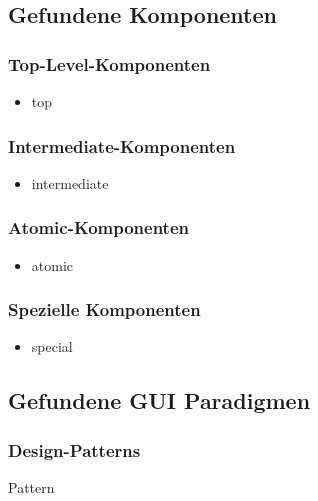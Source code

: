   \subsection{Gefundene Komponenten}
  
  \subsubsection{Top-Level-Komponenten}
  
  \begin{itemize}
    \item top
  \end{itemize}
  
  \subsubsection{Intermediate-Komponenten}
  
  \begin{itemize}
    \item intermediate
  \end{itemize}
  
  \subsubsection{Atomic-Komponenten}
  
  \begin{itemize}
    \item atomic
  \end{itemize}
  
  \subsubsection{Spezielle Komponenten}
    
  \begin{itemize}
    \item special
  \end{itemize}
  
  \subsection{Gefundene GUI Paradigmen}
    
  \subsubsection{Design-Patterns}
  
  \begin{description}
    \item[Pattern]
  \end{description}
  
